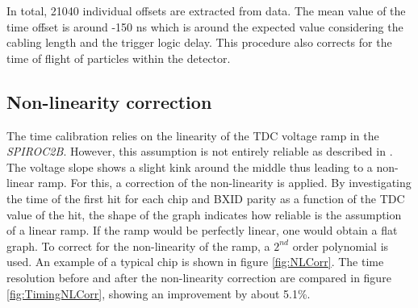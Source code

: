 \documentclass{JINST}
\begin{document}
In total, 21040 individual offsets are extracted from data. The mean value of the time offset is around -150 ns which is around the expected value considering the cabling length and the trigger logic delay. This procedure also corrects for the time of flight of particles within the detector.

\subsection{Non-linearity correction}
\label{sec:Non-linCorr}

The time calibration relies on the linearity of the TDC voltage ramp in the \textit{SPIROC2B}. However, this assumption is not entirely reliable as described in \cite{Hartbrich2011, Brianne2012}. The voltage slope shows a slight kink around the middle thus leading to a non-linear ramp. For this, a correction of the non-linearity is applied. By investigating the time of the first hit for each chip and BXID parity as a function of the TDC value of the hit, the shape of the graph indicates how reliable is the assumption of a linear ramp. If the ramp would be perfectly linear, one would obtain a flat graph. To correct for the non-linearity of the ramp, a $2^{nd}$ order polynomial is used. An example of a typical chip is shown in figure \ref{fig:NLCorr}. The time resolution before and after the non-linearity correction are compared in figure \ref{fig:TimingNLCorr}, showing an improvement by about 5.1\%.
\end{document}
